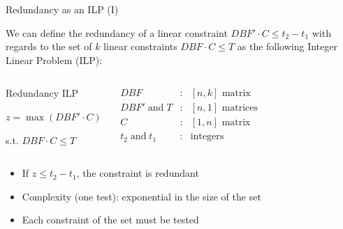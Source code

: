 \documentclass{beamer}
\begin{document}
    \begin{frame}{Redundancy as an ILP (I)}

    We can define the redundancy of a linear constraint $DBF' \cdot C \leqslant t_2 - t_1$ with regards to the set of $k$ linear constraints $DBF \cdot C \leqslant T$ as the following Integer Linear Problem (ILP):

    \begin{columns}[c]

        \begin{block}{Redundancy ILP}

        $z = \max \left( DBF' \cdot C \right)$

        s.t. $DBF  \cdot C \leq T$


        \end{block}


        \[
          \begin{array}{ccc}
            DBF & : & [n,k] \text{ matrix}\\
            DBF' \; \text{and} \; T & : & [n,1] \text{ matrices}\\
            C & : & [1,n] \text{ matrix}\\
            t_2 \; \text{and} \; t_1 & : & \text{integers}
          \end{array}
        \]
    \end{columns}
        \begin{itemize}
            \item If $z \leqslant t_2 - t_1$, the constraint is redundant
            \item Complexity (one test): exponential in the size of the set
            \item Each constraint of the set must be tested
        \end{itemize}

    \end{frame}
\end{document}
